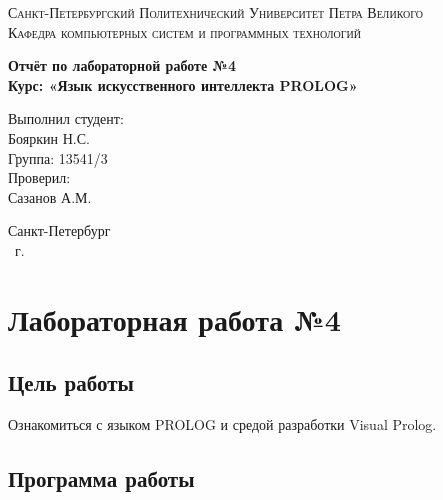 \documentclass[14pt,a4paper,report]{report}
\begin{document}
\def\contentsname{Содержание}

\begin{titlepage}
	\begin{center}
		\textsc{Санкт-Петербургский Политехнический 
			Университет Петра Великого\\[5mm]
			Кафедра компьютерных систем и программных технологий}
		
		\vfill
		
		\textbf{Отчёт по лабораторной работе №4\\[3mm]
			Курс: «Язык искусственного интеллекта PROLOG»\\[41mm]
		}
	\end{center}
	
	\hfill
	\begin{minipage}{.4\textwidth}
		Выполнил студент:\\[2mm] 
		Бояркин Н.С.\\
		Группа: 13541/3\\[5mm]
		
		Проверил:\\[2mm] 
		Сазанов А.М.
	\end{minipage}
	\vfill
	\begin{center}
		Санкт-Петербург\\ \the\year\ г.
	\end{center}
\end{titlepage}

\tableofcontents
\clearpage

\chapter{Лабораторная работа №4}

\section{Цель работы}

Ознакомиться с языком PROLOG и средой разработки Visual Prolog.

\section{Программа работы}
\end{document}
